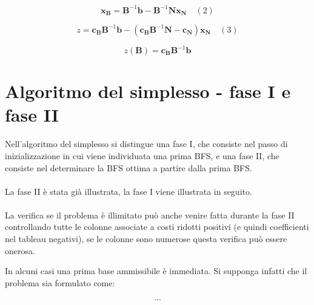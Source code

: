 \documentclass[a4paper, 11pt]{article}
\begin{document}
                \[
                \mathbf{x_B} = \mathbf{B}^{-1} \mathbf{b} - \mathbf{B}^{-1} \mathbf{N x_N} \quad (2)
                \]


                \[
                z = \mathbf{c_B B}^{-1} \mathbf{b} - 
                \left( \mathbf{c_B B}^{-1} \mathbf{N} - \mathbf{c_N} \right) \mathbf{x_N} \quad (3)
                \]

                \[
                z(\mathbf{B}) = \mathbf{c_B B}^{-1} \mathbf{b}
                \]






                








            
        \section{Algoritmo del simplesso - fase I e fase II}
        Nell’algoritmo del simplesso si distingue una fase I, che consiste nel passo di inizializzazione in cui viene individuata una prima BFS, e una fase II, che consiste nel determinare la BFS ottima a partire dalla prima BFS.

        \paragraph{}
        La fase II è stata già illustrata, la fase I viene illustrata in seguito.

        \paragraph{}
        La verifica se il problema è illimitato può anche venire fatta durante la fase II controllando tutte le colonne associate a costi ridotti positivi (e quindi coefficienti nel tableau negativi), se le
        colonne sono numerose questa verifica può essere onerosa.

        In alcuni casi una prima base ammissibile è immediata. Si supponga infatti che il problema sia
        formulato come:

        \begin{align}
            ...
        \end{align}
\end{document}
